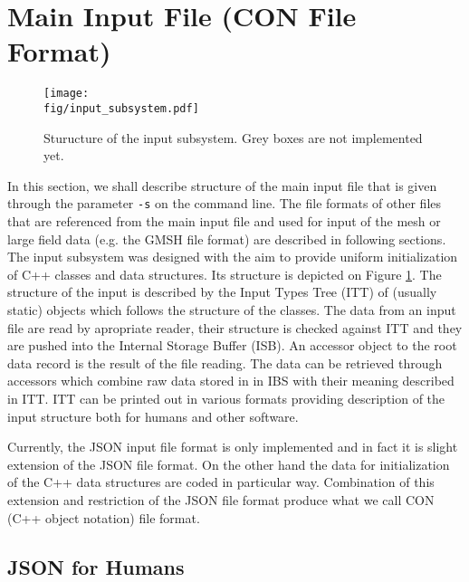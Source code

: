 

\section{Main Input File (CON File Format)}
\label{sec:CONformat}


\begin{figure}
 \begin{center}
 \texttt{[image: \\fig/input\_subsystem.pdf]}
 \caption{Sturucture of the input subsystem. Grey boxes are not implemented yet.}
 \label{fig:input_subsystem}
 \end{center}
\end{figure}

In this section, we shall describe structure of the main input file that is given through the parameter \verb'-s' on the command line.
The file formats of other files that are referenced from the main input file and used for input of the mesh or large field data
(e.g. the GMSH file format) are described in following sections. The input subsystem was designed with the aim to provide uniform initialization of 
C++ classes and data structures. Its structure is depicted on Figure \ref{fig:input_subsystem}.
The structure of the input is described by the Input Types Tree (ITT) of (usually static) objects which follows the structure of the classes.
The data from an input file are read by apropriate reader, their structure is checked against ITT and they are pushed into the Internal Storage Buffer (ISB).
An accessor object to the root data record is the result of the file reading. The data can be retrieved through accessors which combine 
raw data stored in in IBS with their meaning described in ITT. ITT can be printed out in various formats providing description of the input structure both for 
humans and other software.

Currently, the JSON input file format is only implemented and in fact it is slight extension of the JSON file format. On the other hand
the data for initialization of the C++ data structures are coded in particular way. Combination of this extension and restriction of the JSON file format produce 
what we call CON (C++ object notation) file format.


\subsection{JSON for Humans}

